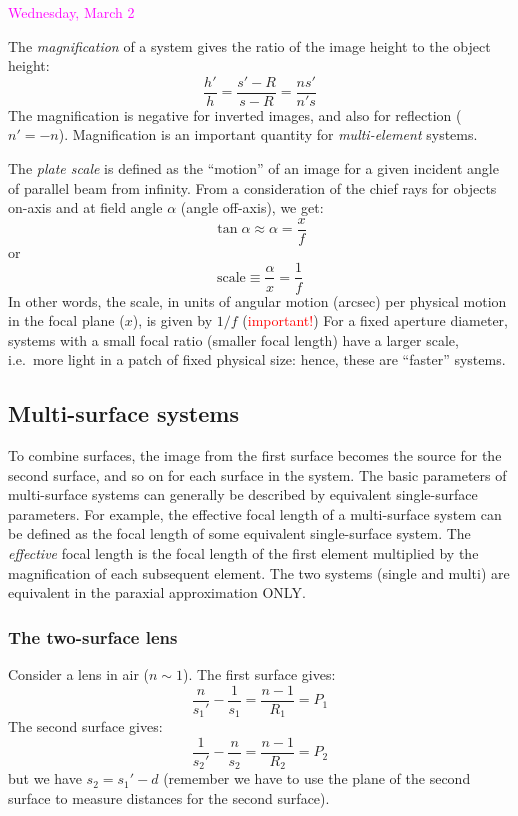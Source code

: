 \documentclass[12pt]{article}
\begin{document}
\textcolor{magenta}{Wednesday, March 2}

The \emph{magnification} of a system gives the ratio of the image height to
the object height:
    $$  \frac{h'}{h} = \frac{s'-R}{s-R} = \frac{ns'}{n's}    $$
The magnification is negative for inverted images, and also for
reflection ($n' = -n$).
Magnification is an important quantity for \emph{multi-element} systems.

The \emph{plate scale} is defined as the
``motion'' of an image for a given incident angle
of parallel beam from infinity.
From a consideration of the chief rays
for objects on-axis and at field angle $ \alpha$ (angle off-axis), we get:
$$ \tan{\alpha} \approx \alpha = \frac{x}{f}  $$
or
$$ \textrm{scale} \equiv \frac{\alpha}{x} = \frac{1}{f}  $$
In other words, the scale, in units of angular motion (arcsec)
per physical motion in the focal plane ($x$), is given by $1/f$
(\textcolor{red}{important!})
For a fixed aperture
diameter, systems with a small focal ratio (smaller focal length) have
a larger scale, i.e.\ more light in a patch of fixed physical size:
hence, these are ``faster'' systems.

\subsection*{Multi-surface systems}
To combine surfaces, the image from the first surface becomes the
source for the second surface, and so on for each surface in the system.
The basic parameters of multi-surface systems can generally be described by
equivalent single-surface parameters.
For example, the effective focal length of a multi-surface system
can be defined as the focal length of some
equivalent single-surface system.
The \emph{effective} focal length is the
focal length of the first element multiplied by the magnification of
each subsequent element. The two systems (single and multi) are
equivalent in the paraxial approximation ONLY\@.

\subsubsection*{The two-surface lens}
Consider a lens in air ($n \sim 1$). The first surface gives:
    $$ \frac{n}{s_1'}-\frac{1}{s_1} = \frac{n-1}{R_1}=P_1  $$
The second surface gives:
    $$ \frac{1}{s_2'}-\frac{n}{s_2} = \frac{n-1}{R_2}=P_2  $$
but we have $s_2 = s_1'-d$ (remember we have to use the plane of the
second surface to measure distances for the second surface).
\end{document}
